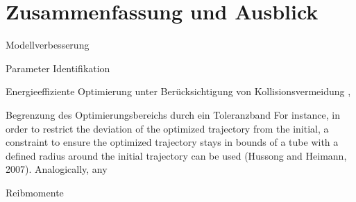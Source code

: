 \chapter{Zusammenfassung und Ausblick}

Modellverbesserung  \cite{Paryanto.2015}

Parameter Identifikation  \cite{Gattringer.2013}

Energieeffiziente Optimierung unter Berücksichtigung von Kollisionsvermeidung  \cite{Bjorkenstam.2013}, \cite{Gleeson.2015}

Begrenzung des Optimierungsbereichs durch ein Toleranzband \cite[S.~55]{Eggers.2019}
For instance, in order to restrict the deviation of the optimized trajectory from the initial, a constraint to ensure the optimized trajectory stays in bounds of a tube with a defined radius around the initial trajectory can be used (Hussong and Heimann, 2007). Analogically, any

Reibmomente \cite[S.~13]{Eggers.2019}

